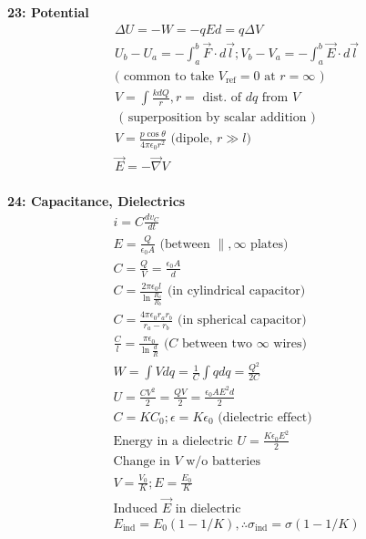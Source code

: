 \documentclass[twoside,draft]{article}
\begin{document}
\begin{multicols}{3}
  \textbf{23: Potential}
  \begin{align*}
    \Delta U = -W = -qEd = q\Delta V \\
    U_b - U_a = -\int_a^b \vec{F} \cdot d\vec{l};
    V_b - V_a = -\int_a^b \vec{E} \cdot d\vec{l} \\
    \text{( common to take $V_{\text{ref}} = 0$ at $r = \infty$ )} \\
    V = \int \frac{kdQ}{r}, r = \text{ dist. of $dq$ from $V$ } \\
    \text{ ( superposition by scalar addition ) } \\
    V = \frac{p\cos\theta}{4\pi\epsilon_0r^2} \text{ (dipole, $r \gg l$) } \\
    \vec{E} = -\vec{\nabla} V \\
  \end{align*}

  \textbf{24: Capacitance, Dielectrics}
  \begin{align*}
    i = C \frac{dv_C}{dt} \\
    E = \frac{Q}{\epsilon_{0} A} \text{ (between $\parallel, \infty$ plates) } \\
    C = \frac{Q}{V} = \frac{\epsilon_{0} A}{d} \\
    C = \frac{2\pi \epsilon_{0} l}{\ln{\frac{R_{a}}{R_{b}}}}
    \text{ (in cylindrical capacitor) } \\
    C = \frac{4\pi \epsilon_{0} r_{a} r_{b}}{r_{a} - r_{b}}
    \text{ (in spherical capacitor) } \\
    \frac{C}{l} = \frac{\pi \epsilon_{0}}{\ln{\frac{d}{R}}}
    \text{ ($C$ between two $\infty$ wires) } \\
    W = \int{V dq} = \frac{1}{C}\int{qdq} = \frac{Q^2}{2C} \\
    U = \frac{CV^2}{2} = \frac{QV}{2} = \frac{\epsilon_{0}AE^2d}{2} \\
    C = KC_{0}; \epsilon = K\epsilon_{0}
    \text{ (dielectric effect) } \\
    \text{Energy in a dielectric } U = \frac{K\epsilon_{0}E^2}{2} \\
    \text{Change in $V$ w/o batteries } \\
    V = \frac{V_{0}}{K};
    E = \frac{E_{0}}{K} \\
    \text{Induced $\vec{E}$ in dielectric} \\
    E_{\text{ind}} = E_{0}(1-1/K), \therefore \sigma_{\text{ind}} = \sigma(1-1/K) \\
  \end{align*}

\end{multicols}
\end{document}
